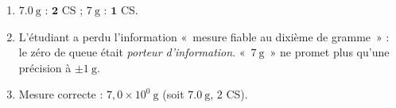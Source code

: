 \documentclass[11pt,a4paper]{article}
\begin{document}
\begin{corrige}
\begin{enumerate}[label=\alph*)]
  \item $\qty{7,0}{\gram}$ : $\mathbf{2}$ CS ; $\qty{7}{\gram}$ : $\mathbf{1}$ CS.
  \item L'étudiant a perdu l'information «~mesure fiable au dixième de gramme~» : le zéro de queue était
        \emph{porteur d'information}. «~$\qty{7}{\gram}$~» ne promet plus qu'une précision à $\pm\qty{1}{\gram}$.
  \item Mesure correcte : $\boxed{7,0\times10^{0}\ \si{\gram}}$ (soit $\qty{7,0}{\gram}$, $2$ CS).
\end{enumerate}
\end{corrige}
\end{document}
